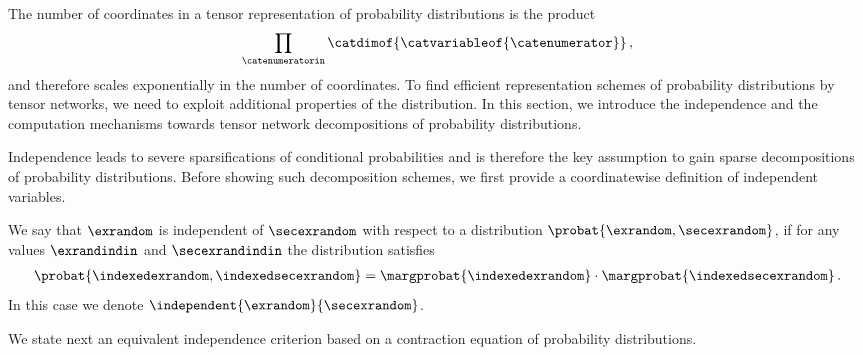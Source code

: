 
The number of coordinates in a tensor representation of probability distributions is the product
\begin{align*}
    \prod_{\catenumeratorin}\catdimof{\catvariableof{\catenumerator}} \, ,
\end{align*}
and therefore scales exponentially in the number of coordinates.
To find efficient representation schemes of probability distributions by tensor networks, we need to exploit additional properties of the distribution.
In this section, we introduce the independence and the computation mechanisms towards tensor network decompositions of probability distributions.


Independence leads to severe sparsifications of conditional probabilities and is therefore the key assumption to gain sparse decompositions of probability distributions.
Before showing such decomposition schemes, we first provide a coordinatewise definition of independent variables.

\begin{definition}[Independence]
    \label{def:independence}
    We say that $\exrandom$ is independent of $\secexrandom$ with respect to a distribution $\probat{\exrandom,\secexrandom}$, if for any values $\exrandindin$ and $\secexrandindin$ the distribution satisfies
    \begin{align*}
        \probat{\indexedexrandom,\indexedsecexrandom}
        = \margprobat{\indexedexrandom}\cdot\margprobat{\indexedsecexrandom} \, .
    \end{align*}
    In this case we denote $\independent{\exrandom}{\secexrandom}$.
\end{definition}

We state next an equivalent independence criterion based on a contraction equation of probability distributions.

